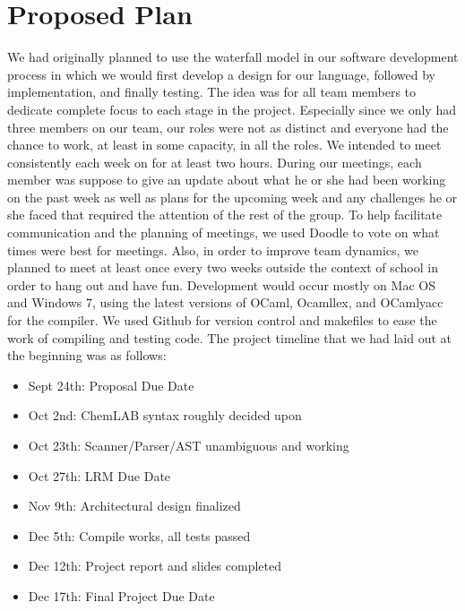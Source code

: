 \documentclass[11pt]{report}
\begin{document}
\section{Proposed Plan}
We had originally planned to use the waterfall model in our software development process in which we would first develop a design for our language, followed by implementation, and finally testing. The idea was for all team members to dedicate complete focus to each stage in the project. Especially since we only had three members on our team, our roles were not as distinct and everyone had the chance to work, at least in some capacity, in all the roles. We intended to meet consistently each week on for at least two hours. During our meetings, each member was suppose to give an update about what he or she had been working on the past week as well as plans for the upcoming week and any challenges he or she faced that required the attention of the rest of the group. To help facilitate communication and the planning of meetings, we used Doodle to vote on what times were best for meetings. Also, in order to improve team dynamics, we planned to meet at least once every two weeks outside the context of school in order to hang out and have fun. Development would occur mostly on Mac OS and Windows 7, using the latest versions of OCaml, Ocamllex, and OCamlyacc for the compiler. We used Github for version control and makefiles to ease the work of compiling and testing code. The project timeline that we had laid out at the beginning was as follows:
\begin{itemize}
\item Sept 24th: Proposal Due Date
\item Oct 2nd: ChemLAB syntax roughly decided upon
\item Oct 23th: Scanner/Parser/AST unambiguous and working
\item Oct 27th: LRM Due Date
\item Nov 9th: Architectural design finalized
\item Dec 5th: Compile works, all tests passed
\item Dec 12th: Project report and slides completed 
\item Dec 17th: Final Project Due Date 
\end{itemize}
\end{document}
